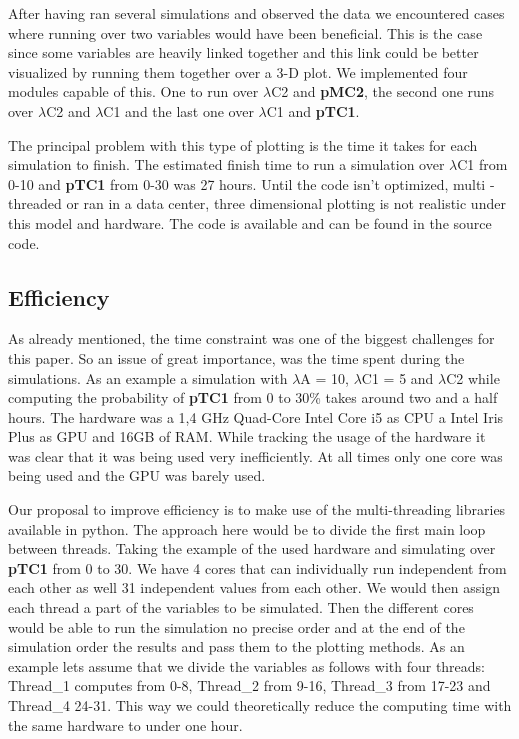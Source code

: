 After having ran several simulations and observed the data we encountered cases where running over two variables would have been beneficial. This is the case since some variables are heavily linked together and this link could be better visualized by running them together over a 3-D plot. We implemented four modules capable of this. One to run over $\lambda$C2 and \textbf{pMC2}, the second one runs over $\lambda$C2 and $\lambda$C1 and the last one over $\lambda$C1 and \textbf{pTC1}.

The principal problem with this type of plotting is the time it takes for each simulation to finish. The estimated finish time to run a simulation over $\lambda$C1 from 0-10 and \textbf{pTC1} from 0-30 was 27 hours. Until the code isn't optimized, multi -threaded or ran in a data center, three dimensional plotting is not realistic under this model and hardware. The code is available and can be found in the source code.

\subsection{Efficiency}

As already mentioned, the time constraint was one of the biggest challenges for this paper. So an issue of great importance, was the time spent during the simulations. As an example a simulation with $\lambda$A = 10, $\lambda$C1 = 5 and $\lambda$C2 while computing the probability of \textbf{pTC1} from 0 to 30\% takes around two and a half hours. The hardware was a 1,4 GHz Quad-Core Intel Core i5 as CPU a Intel Iris Plus as GPU and 16GB of RAM. While tracking the usage of the hardware it was clear that it was being used very inefficiently. At all times only one core was being used and the GPU was barely used.

Our proposal to improve efficiency is to make use of the multi-threading libraries available in python. The approach here would be to divide the first main loop between threads. Taking the example of the used hardware and simulating over \textbf{pTC1} from 0 to 30. We have 4 cores that can individually run independent from each other as well 31 independent values from each other. We would then assign each thread a part of the variables to be simulated. Then the different cores would be able to run the simulation no precise order and at the end of the simulation order the results and pass them to the plotting methods. As an example lets assume that we divide the variables as follows with four threads: Thread\_1 computes from 0-8, Thread\_2 from 9-16, Thread\_3 from 17-23 and Thread\_4 24-31. This way we could theoretically reduce the computing time with the same hardware to under one hour.

